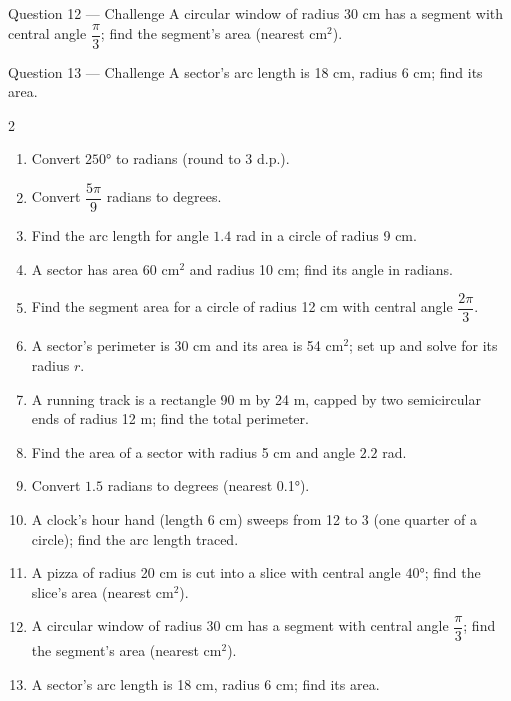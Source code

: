 \documentclass[11pt]{article}
\begin{document}
\begin{qbox}{Question 12 --- Challenge}
A circular window of radius 30 cm has a segment with central angle $\dfrac{\pi}{3}$; find the segment's area (nearest cm$^2$).\workspace{3.2cm}
\end{qbox}

\begin{qbox}{Question 13 --- Challenge}
A sector's arc length is 18 cm, radius 6 cm; find its area.\workspace{3cm}
\end{qbox}

\clearpage
{}

\begin{recapbox}
\begin{multicols}{2}
\small
\begin{enumerate}[leftmargin=*,itemsep=3pt]
  \item Convert $250°$ to radians (round to 3 d.p.).
  \item Convert $\dfrac{5\pi}{9}$ radians to degrees.
  \item Find the arc length for angle $1.4$ rad in a circle of radius 9 cm.
  \item A sector has area 60 cm$^2$ and radius 10 cm; find its angle in radians.
  \item Find the segment area for a circle of radius 12 cm with central angle $\dfrac{2\pi}{3}$.
  \item A sector's perimeter is 30 cm and its area is 54 cm$^2$; set up and solve for its radius $r$.
  \item A running track is a rectangle 90 m by 24 m, capped by two semicircular ends of radius 12 m; find the total perimeter.
  \item Find the area of a sector with radius 5 cm and angle $2.2$ rad.
  \item Convert $1.5$ radians to degrees (nearest 0.1°).
  \item A clock's hour hand (length 6 cm) sweeps from 12 to 3 (one quarter of a circle); find the arc length traced.
  \item A pizza of radius 20 cm is cut into a slice with central angle $40°$; find the slice's area (nearest cm$^2$).
  \item A circular window of radius 30 cm has a segment with central angle $\dfrac{\pi}{3}$; find the segment's area (nearest cm$^2$).
  \item A sector's arc length is 18 cm, radius 6 cm; find its area.
\end{enumerate}
\end{multicols}
\end{recapbox}
\end{document}
